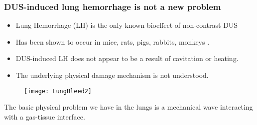\begin{frame} \frametitle{\vspace*{0.5cm}DUS-induced lung hemorrhage is not a new problem}
  {\small%
    \begin{itemize}%
    \item Lung Hemorrhage (LH) is the only known bioeffect of non-contrast DUS%
    \item Has been shown to occur in mice, rats, pigs, rabbits, monkeys \citep{Child1990,OBrien1997a,Tarantal1994a}.%
    \item DUS-induced LH does not appear to be a result of cavitation or heating.%
    \item The underlying physical damage mechanism is not understood.%
    \end{itemize}%
    \begin{figure}%
      \centering%
      \texttt{[image: LungBleed2]} \nocite{Miller2012}%
    \end{figure}%
    The basic physical problem we have in the lungs is a mechanical wave interacting with a gas-tissue interface.
  }
\end{frame}

